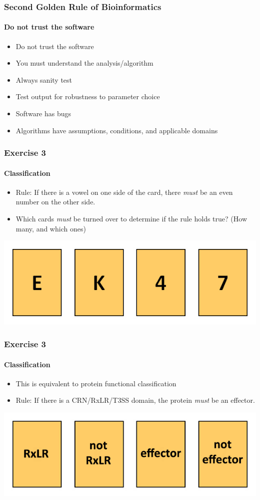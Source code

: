 \documentclass[table]{beamer}
\begin{document}
  \begin{frame}
    \frametitle{Second Golden Rule of Bioinformatics}
    \framesubtitle{Do not trust the software}
	\begin{itemize}
	  \item Do not trust the software
	  \item You must understand the analysis/algorithm
	  \item Always sanity test
	  \item Test output for robustness to parameter choice
	  \item Software has bugs
	  \item Algorithms have assumptions, conditions, and applicable domains
	\end{itemize}
  \end{frame}
  
  \begin{frame}
    \frametitle{Exercise 3}
    \framesubtitle{Classification}
    \begin{itemize}
      \item Rule: If there is a vowel on one side of the card, there \textit{must} be an even number on the other side.
      \item Which cards \textit{must} be turned over to determine if the rule holds true? (How many, and which ones)
    \end{itemize}
    \includegraphics[width=\textwidth]{images/wason}
  \end{frame}

  \begin{frame}
    \frametitle{Exercise 3}
    \framesubtitle{Classification}
    \begin{itemize}
      \item This is equivalent to protein functional classification
      \item Rule: If there is a CRN/RxLR/T3SS domain, the protein \textit{must} be an effector.
    \end{itemize}
    \includegraphics[width=\textwidth]{images/wason_rxlr}
  \end{frame}
\end{document}
